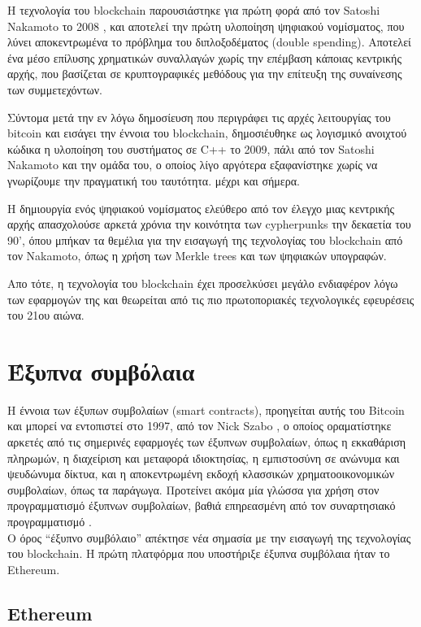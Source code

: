 
Η τεχνολογία του blockchain παρουσιάστηκε για πρώτη φορά από τον Satoshi
Nakamoto το 2008 \cite{bitcoin}, και αποτελεί την πρώτη υλοποίηση ψηφιακού
νομίσματος, που λύνει αποκεντρωμένα το πρόβλημα του διπλοξοδέματος (double
spending).  Αποτελεί ένα μέσο επίλυσης χρηματικών συναλλαγών χωρίς την επέμβαση
κάποιας κεντρικής αρχής, που βασίζεται σε κρυπτογραφικές μεθόδους για την
επίτευξη της συναίνεσης των συμμετεχόντων.

Σύντομα μετά την εν λόγω δημοσίευση που περιγράφει τις αρχές λειτουργίας του
bitcoin και εισάγει την έννοια του blockchain, δημοσιέυθηκε ως λογισμικό
ανοιχτού κώδικα η υλοποίηση του συστήματος σε C++ το 2009, πάλι από τον Satoshi
Nakamoto και την ομάδα του, ο οποίος λίγο αργότερα εξαφανίστηκε χωρίς να
γνωρίζουμε την πραγματική του ταυτότητα. μέχρι και σήμερα.


Η δημιουργία ενός ψηφιακού νομίσματος ελεύθερο από τον έλεγχο μιας κεντρικής
αρχής απασχολούσε αρκετά χρόνια την κοινότητα των cypherpunks την δεκαετία του
90', όπου μπήκαν τα θεμέλια για την εισαγωγή της τεχνολογίας του blockchain από
τον Nakamoto, όπως η χρήση των Merkle trees και των ψηφιακών υπογραφών.

Απο τότε, η τεχνολογία του blockchain έχει προσελκύσει μεγάλο ενδιαφέρον λόγω
των εφαρμογών της και θεωρείται από τις πιο πρωτοποριακές τεχνολογικές
εφευρέσεις του 21ου αιώνα.


\section{Έξυπνα συμβόλαια}

Η έννοια των έξυπων συμβολαίων (smart contracts), προηγείται αυτής του Bitcoin
και μπορεί να εντοπιστεί στο 1997, από τον Nick Szabo \cite{szabo1}, ο οποίος
οραματίστηκε αρκετές από τις σημερινές εφαρμογές των έξυπνων συμβολαίων, όπως η
εκκαθάριση πληρωμών, η διαχείριση και μεταφορά ιδιοκτησίας,  η εμπιστοσύνη σε
ανώνυμα και ψευδώνυμα δίκτυα, και η αποκεντρωμένη εκδοχή κλασσικών
χρηματοοικονομικών συμβολαίων, όπως τα παράγωγα. Προτείνει ακόμα μία γλώσσα για
χρήση στον προγραμματισμό έξυπνων συμβολαίων, βαθιά επηρεασμένη από τον
συναρτησιακό προγραμματισμό \cite{szabosmartcontract}.  \\ Ο όρος ``έξυπνο
συμβόλαιο'' απέκτησε νέα σημασία με την εισαγωγή της τεχνολογίας του blockchain.
Η πρώτη πλατφόρμα που υποστήριξε έξυπνα συμβόλαια ήταν το Ethereum.

\subsection{Ethereum}

